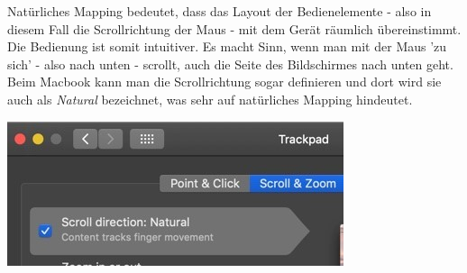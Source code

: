 Natürliches Mapping bedeutet, dass das Layout der Bedienelemente - 
also in diesem Fall die Scrollrichtung der Maus - mit dem Gerät räumlich übereinstimmt.
Die Bedienung ist somit intuitiver. Es macht Sinn, wenn man mit der Maus 'zu sich' - also nach unten -
scrollt, auch die Seite des Bildschirmes nach unten geht. Beim Macbook kann man die
Scrollrichtung sogar definieren und dort wird sie auch als \textit{Natural} bezeichnet, was 
sehr auf natürliches Mapping hindeutet.

\includegraphics[scale=.5]{images/ScrolldirectionCut.jpg}